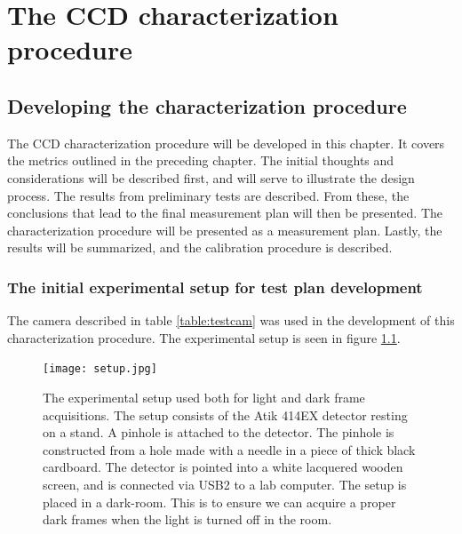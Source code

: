 \documentclass[../main.tex]{subfiles}
\begin{document}
	
	\chapter{The CCD characterization procedure}
		\section{Developing the characterization procedure}
		The CCD characterization procedure will be developed in this chapter. It covers the metrics outlined in the preceding chapter. The initial thoughts and considerations will be described first, and will serve to illustrate the design process. The results from preliminary tests are described. From these, the conclusions that lead to the final measurement plan will then be presented. The characterization procedure will be presented as a measurement plan. Lastly, the results will be summarized, and the calibration procedure is described.
		
		\subsection{The initial experimental setup for test plan development}\label{sec:setup}
		The camera described in table \ref{table:testcam} was used in the development of this characterization procedure. The experimental setup is seen in figure \ref{fig:setup}. 
		
		\begin{figure}
			\centering
			\texttt{[image: setup.jpg]}
			\caption{The experimental setup used both for light and dark frame acquisitions. The setup consists of the Atik 414EX detector resting on a stand. A pinhole is attached to the detector. The pinhole is constructed from a hole made with a needle in a piece of thick black cardboard. The detector is pointed into a white lacquered wooden screen, and is connected via USB2 to a lab computer. The setup is placed in a dark-room. This is to ensure we can acquire a proper dark frames when the light is turned off in the room.}
			\label{fig:setup}
		\end{figure}
		
\end{document}
